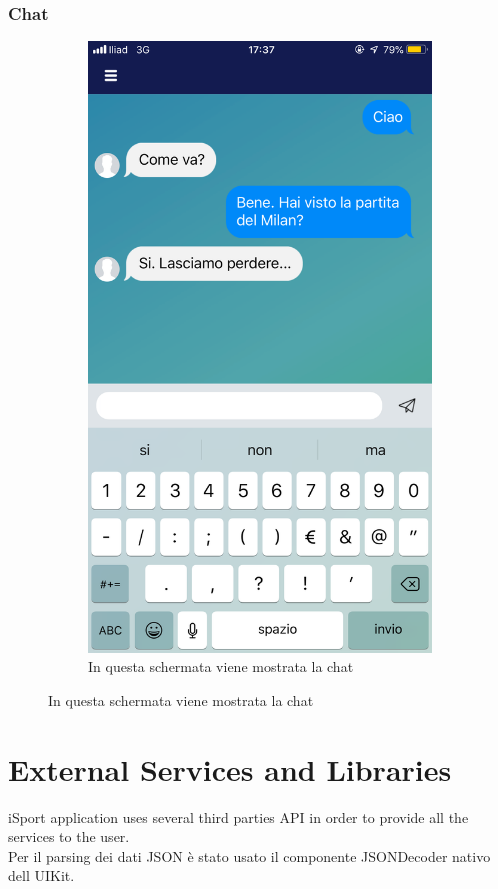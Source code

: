 \documentclass[numbers=noenddot, 12pt, a4paper, oneside]{scrbook}
\begin{document}
\subsection*{Chat}
\begin{figure}[H]
	\centering
	\begin{subfigure}{.5\textwidth}
		\centering
		\includegraphics[width=.8\linewidth]{images/Screen/Chat}
		\caption{In questa schermata viene mostrata la chat}
	\end{subfigure}
\end{figure}


\chapter{External Services and Libraries}
iSport application uses several third parties API in order to provide all the services to the user.\\
Per il parsing dei dati JSON è stato usato il componente JSONDecoder nativo dell UIKit.
\end{document}
